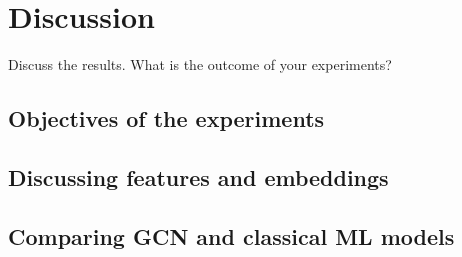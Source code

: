 \chapter{Discussion}\label{chap:discussion}

Discuss the results. What is the outcome of your experiments?

\section{Objectives of the experiments}

\section{Discussing features and embeddings}

\section{Comparing GCN and classical ML models}


